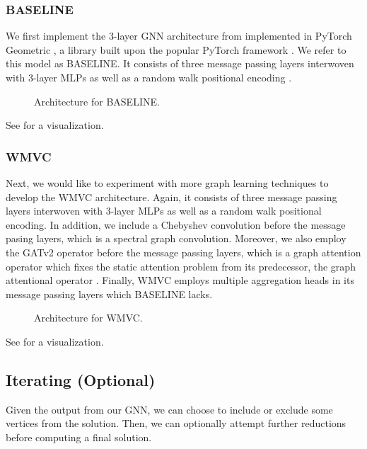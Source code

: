 \documentclass{article}
\begin{document}
\subsubsection{BASELINE}
We first implement the 3-layer GNN architecture from \citet{langedal_et_al}
implemented in PyTorch Geometric \citet{pyg},
a library built upon the popular PyTorch framework \citet{pytorch}.
We refer to this model as BASELINE.
It consists of three message passing layers
interwoven with 3-layer MLPs
as well as a random walk positional encoding \citet{dwivedi2021graph}.

\begin{figure}
     \centering
     \caption{Architecture for BASELINE.}
     \label{fig:baseline_arch}
\end{figure}

See  for a visualization.

\subsubsection{WMVC}
Next, we would like to experiment with more graph learning techniques
to develop the WMVC architecture.
Again,
it consists of three message passing layers
interwoven with 3-layer MLPs
as well as a random walk positional encoding.
In addition,
we include a Chebyshev convolution \citet{defferrard2016conv} before the message pasing layers,
which is a spectral graph convolution.
Moreover,
we also employ the GATv2 operator \citet{brody2021attentive} before the message passing layers,
which is a graph attention operator which fixes the static attention problem from its predecessor,
the graph attentional operator \citet{velivckovic2017graph}.
Finally,
WMVC employs multiple aggregation heads \citet{corso2020principal, tailor2021we} in its message passing layers which BASELINE lacks.

\begin{figure}
     \centering
     \caption{Architecture for WMVC.}
     \label{fig:wmvc_arch}
\end{figure}

See  for a visualization.

\subsection{Iterating (Optional)}
Given the output from our GNN,
we can choose to include or exclude some vertices from the solution.
Then,
we can optionally attempt further reductions before computing a final solution.
\end{document}
